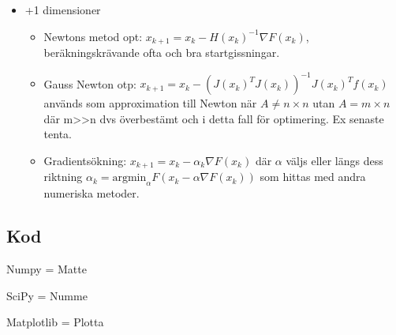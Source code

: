 \documentclass[a4paper]{article}
\begin{document}
\begin{itemize}
\begin{itemize}
\begin{itemize}
        \end{itemize}
        \item +1 dimensioner
        \begin{itemize}
            \item Newtons metod opt: $x_{k+1}=x_k-H(x_k)^{-1}\nabla F(x_k)$, beräkningskrävande ofta och bra startgissningar.
            \item Gauss Newton otp: $x_{k+1}=x_k-(J(x_k)^TJ(x_k))^{-1}J(x_k)^Tf(x_k)$ används som approximation till Newton när $A\neq n\times n$ utan $A=m\times n$ där m>>n dvs överbestämt och i detta fall för optimering. Ex senaste tenta.
            \item Gradientsökning: $x_{k+1}=x_k-\alpha_k\nabla F(x_k)$ där $\alpha$ väljs eller längs dess riktning $\alpha_k=\text{argmin}_\alpha F(x_k-\alpha\nabla F(x_k))$ som hittas med andra numeriska metoder.
        \end{itemize}
    \end{itemize}
\end{itemize}

\subsection{Kod}

Numpy = Matte

SciPy = Numme

Matplotlib = Plotta
\end{document}
